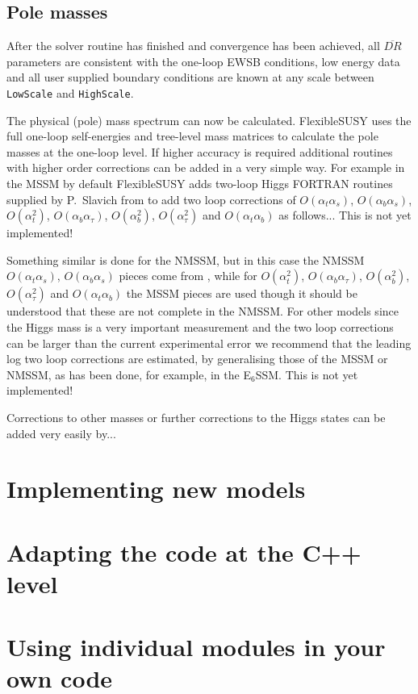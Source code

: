 \documentclass[final,3p,times,pdflatex]{elsarticle}
\newcommand{\fs}{FlexibleSUSY\xspace}
\newcommand{\code}[1]{\lstinline|#1|}  %
\def\at{\alpha_t}
\def\ab{\alpha_b}
\def\as{\alpha_s}
\def\atau{\alpha_{\tau}}
\def\oatab{O(\at\ab)}
\def\oatas{O(\at\as)}
\def\oabas{O(\ab\as)}
\def\oatq{O(\at^2)}
\def\oabq{O(\ab^2)}
\def\oatauq{O(\atau^2)}
\def\oabatau{O(\ab \atau)}
\begin{document}
\subsection{Pole masses}
After the solver routine has finished and convergence has been
achieved, all $\overline{DR}$ parameters are consistent with the
one-loop EWSB conditions, low energy data and all user supplied
boundary conditions are known at any scale between \code{LowScale} and
\code{HighScale}.

The physical (pole) mass spectrum can now be calculated.  \fs uses the
full one-loop self-energies and tree-level mass matrices to calculate
the pole masses at the one-loop level.  If higher accuracy is required
additional routines with higher order corrections can be added in a
very simple way. For example in the MSSM by default \fs adds two-loop
Higgs FORTRAN routines supplied by P.~Slavich from
\cite{slavich-degrassi} to add two loop corrections of $\oatas$,
$\oabas$, $\oatq$, $\oabatau$, $\oabq$, $\oatauq$ and $\oatab$ as
follows... {\color{red} This is not yet implemented!}

Something similar is done for the NMSSM, but in this case the NMSSM
$\oatas$, $\oabas$ pieces come from \cite{Degrassi:2009yq}, while for
$\oatq$, $\oabatau$, $\oabq$, $\oatauq$ and $\oatab$ the MSSM pieces
are used though it should be understood that these are not complete in
the NMSSM. For other models since the Higgs mass is a very important
measurement and the two loop corrections can be larger than the
current experimental error \cite{Degrassi:2009yq} we recommend that
the leading log two loop corrections are estimated, by generalising
those of the MSSM or NMSSM, as has been done, for example, in the
E$_6$SSM\cite{King:2005jy}.  {\color{red} This is not yet implemented!}

Corrections to other masses or further corrections to the Higgs states
can be added very easily by...

\section{Implementing new models}
\section{Adapting the code at the C++ level}
\section{Using individual modules in your own code}
\end{document}
